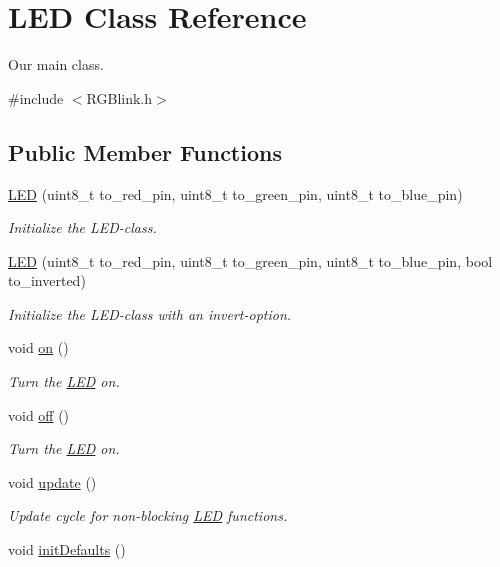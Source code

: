 \hypertarget{class_l_e_d}{\section{L\-E\-D Class Reference}
\label{class_l_e_d}
}


Our main class.  




{\ttfamily \#include $<$R\-G\-Blink.\-h$>$}

\subsection*{Public Member Functions}
\begin{DoxyCompactItemize}
\item 
\hyperlink{class_l_e_d_a720f6a00ca3a8ba52803bee2652a90cd}{L\-E\-D} (uint8\-\_\-t to\-\_\-red\-\_\-pin, uint8\-\_\-t to\-\_\-green\-\_\-pin, uint8\-\_\-t to\-\_\-blue\-\_\-pin)
\begin{DoxyCompactList}\small\item\em Initialize the L\-E\-D-\/class. \end{DoxyCompactList}\item 
\hyperlink{class_l_e_d_ad21f978e664553c4fbdfab1930a11f5e}{L\-E\-D} (uint8\-\_\-t to\-\_\-red\-\_\-pin, uint8\-\_\-t to\-\_\-green\-\_\-pin, uint8\-\_\-t to\-\_\-blue\-\_\-pin, bool to\-\_\-inverted)
\begin{DoxyCompactList}\small\item\em Initialize the L\-E\-D-\/class with an invert-\/option. \end{DoxyCompactList}\item 
void \hyperlink{class_l_e_d_ae712764359a7dd95cc7c7829a1e71ac1}{on} ()
\begin{DoxyCompactList}\small\item\em Turn the \hyperlink{class_l_e_d}{L\-E\-D} on. \end{DoxyCompactList}\item 
void \hyperlink{class_l_e_d_a346e4b72ca59cde82feeb4ea61b23b79}{off} ()
\begin{DoxyCompactList}\small\item\em Turn the \hyperlink{class_l_e_d}{L\-E\-D} on. \end{DoxyCompactList}\item 
void \hyperlink{class_l_e_d_ad615d612f5b0c7dac4dde5245f191382}{update} ()
\begin{DoxyCompactList}\small\item\em Update cycle for non-\/blocking \hyperlink{class_l_e_d}{L\-E\-D} functions. \end{DoxyCompactList}\item 
\hypertarget{class_l_e_d_a98f5db03f99a54710a01267144dee494}{void \hyperlink{class_l_e_d_a98f5db03f99a54710a01267144dee494}{init\-Defaults} ()}\label{class_l_e_d_a98f5db03f99a54710a01267144dee494}


\end{DoxyCompactItemize}
